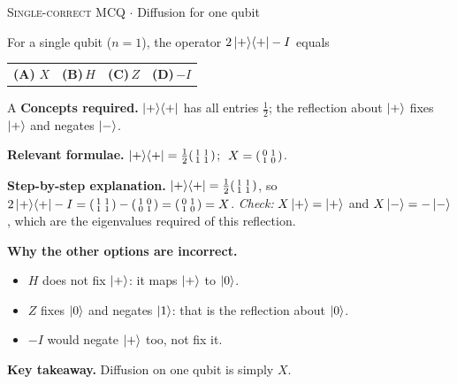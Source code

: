 \documentclass[11pt,a4paper]{article}
\newcommand{\optlabel}[1]{\textbf{(#1)}}
\newcommand{\correctlabel}[1]{\textcolor{okgreen}{\textbf{(#1)}\,\ding{51}}}
\newenvironment{qitem}[1]{\begin{list}{}{\setlength{\leftmargin}{3.3em}\setlength{\labelwidth}{3.1em}%
  \setlength{\labelsep}{0.2em}\setlength{\topsep}{3pt}\setlength{\parsep}{3pt}}\item[\textbf{Q.#1}\hfill]}{\end{list}}
\newcommand{\qsep}{\par\vspace{2pt}{\color{black!15}\hrule}\vspace{4pt}}
\newcommand{\qmeta}[2]{{\footnotesize\color{black!60}\textsc{#1} \;$\cdot$\; #2}\par}
\begin{document}
\begin{qitem}{33}
\qmeta{Single-correct MCQ}{Diffusion for one qubit}
For a single qubit ($n = 1$), the operator $2\ket{+}\!\bra{+} - I$ equals
\par\smallskip\noindent\begin{tabularx}{\linewidth}{@{}*{4}{L}@{}}
\correctlabel{A}\,$X$ & \optlabel{B}\,$H$ & \optlabel{C}\,$Z$ & \optlabel{D}\,$-I$
\end{tabularx}
\end{qitem}
\begin{solbox}{A}
\textbf{\color{brand}Concepts required.} $\ket{+}\!\bra{+}$ has all entries $\frac12$; the reflection about $\ket{+}$ fixes $\ket{+}$ and negates $\ket{-}$.

\textbf{\color{brand}Relevant formulae.} $\ket{+}\!\bra{+} = \frac12\begin{psmallmatrix}1&1\\1&1\end{psmallmatrix}$; $\;X = \begin{psmallmatrix}0&1\\1&0\end{psmallmatrix}$.

\textbf{\color{brand}Step-by-step explanation.} $\ket{+}\!\bra{+} = \frac12\begin{psmallmatrix}1&1\\1&1\end{psmallmatrix}$, so $2\ket{+}\!\bra{+} - I = \begin{psmallmatrix}1&1\\1&1\end{psmallmatrix} - \begin{psmallmatrix}1&0\\0&1\end{psmallmatrix} = \begin{psmallmatrix}0&1\\1&0\end{psmallmatrix} = X$.
\emph{Check:} $X\ket{+} = \ket{+}$ and $X\ket{-} = -\ket{-}$, which are the eigenvalues required of this reflection.

\textbf{\color{brand}Why the other options are incorrect.}
\begin{itemize}[leftmargin=2.4em, itemsep=1pt, topsep=2pt]
\item[\textbf{(B)}] $H$ does not fix $\ket{+}$: it maps $\ket{+}$ to $\ket0$.
\item[\textbf{(C)}] $Z$ fixes $\ket0$ and negates $\ket1$: that is the reflection about $\ket0$.
\item[\textbf{(D)}] $-I$ would negate $\ket{+}$ too, not fix it.
\end{itemize}
\textbf{\color{brand}Key takeaway.} Diffusion on one qubit is simply $X$.
\end{solbox}
\qsep
\end{document}
